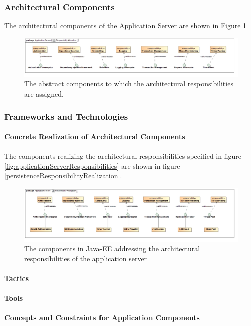 \subsubsection{Architectural Components}
The architectural components of the Application Server are shown in Figure \ref{fig:applicationServerResponsibilityAllocation}
\begin{figure}[H]
	\begin{center}
	\includegraphics[scale=0.4]{../Diagrams and Charts/Application Server/ResponsibilityAllocation.jpg}
	\caption{The abstract components to which the architectural responsibilities are assigned.}
	\label{fig:applicationServerResponsibilityAllocation}
	\end{center}
\end{figure}

\subsubsection{Frameworks and Technologies}
\paragraph{Concrete Realization of Architectural Components}
The components realizing the architectural responsibilities specified in figure \ref{fig:applicationServerResponsibilities} are shown in figure \ref{persistenceResponsibilityRealization}.
\begin{figure}[H]
	\begin{center}
	\includegraphics[scale=0.4]{../Diagrams and Charts/Application Server/ResponsibilityRealization.jpg}
	\caption{The components in Java-EE addressing the architectural responsibilities of the application server}
	\label{fig:persistenceResponsibilityRealization}
	\end{center}
\end{figure}

\paragraph{Tactics}
\paragraph{Tools}
\paragraph{Concepts and Constraints for Application Components}
